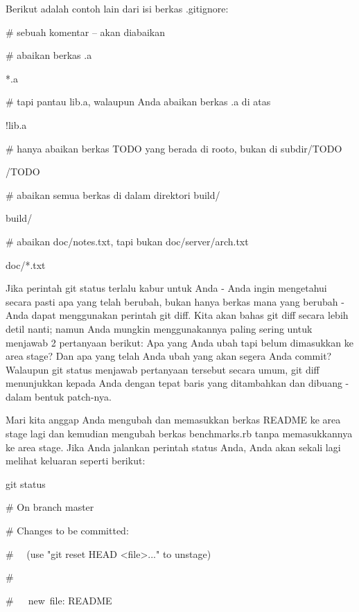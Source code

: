 \noindent 
Berikut adalah contoh lain dari isi berkas .gitignore: \par
\noindent 
 $  \#  $ sebuah komentar – akan diabaikan \par
\noindent 
 $  \#  $ abaikan berkas .a \par
\noindent 
*.a \par
\noindent 
 $  \#  $ tapi pantau lib.a, walaupun Anda abaikan berkas .a di atas \par
\noindent 
!lib.a \par
\noindent 
 $  \#  $ hanya abaikan berkas TODO yang berada di rooto, bukan di subdir/TODO \par
\noindent 
/TODO \par
\noindent 
 $  \#  $ abaikan semua berkas di dalam direktori build/ \par
\noindent 
build/ \par
\noindent 
 $  \#  $ abaikan doc/notes.txt, tapi bukan doc/server/arch.txt \par
\noindent 
doc/*.txt \par
\noindent 
Jika perintah git status terlalu kabur untuk Anda - Anda ingin mengetahui secara pasti apa yang telah berubah, bukan hanya berkas mana yang berubah - Anda dapat menggunakan perintah git diff. Kita akan bahas git diff secara lebih detil nanti; namun Anda mungkin menggunakannya paling sering untuk menjawab 2 pertanyaan berikut: Apa yang Anda ubah tapi belum dimasukkan ke area stage? Dan apa yang telah Anda ubah yang akan segera Anda commit? Walaupun git status menjawab pertanyaan tersebut secara umum, git diff menunjukkan kepada Anda dengan tepat baris yang ditambahkan dan dibuang - dalam bentuk patch-nya. \par
\noindent 
Mari kita anggap Anda mengubah dan memasukkan berkas README ke area stage lagi dan kemudian mengubah berkas benchmarks.rb tanpa memasukkannya ke area stage. Jika Anda jalankan perintah status Anda, Anda akan sekali lagi melihat keluaran seperti berikut: \par
\vspace{12pt}
\noindent 
git status \par
\noindent 
 $  \#  $ On branch master \par
\noindent 
 $  \#  $ Changes to be committed: \par
\noindent 
 $  \#  $~~ (use "git reset HEAD <file>..." to unstage) \par
\noindent 
 $  \#  $ \par
\noindent 
 $  \#  $~~~new~file:   README \par
